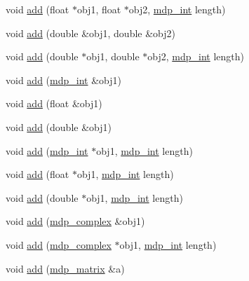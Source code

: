 \begin{DoxyCompactItemize}
\item 
void \hyperlink{classmdp__communicator_aba7a8da3cb9ef8f8fe782864fdfb4e48}{add} (float $\ast$obj1, float $\ast$obj2, \hyperlink{mdp__global__vars_8h_aaa1ad9d0dcd2124aa5af0120d9954174}{mdp\+\_\+int} length)
\item 
void \hyperlink{classmdp__communicator_a6386050a1fa9b536ab8eae4bc922fbad}{add} (double \&obj1, double \&obj2)
\item 
void \hyperlink{classmdp__communicator_a03f093e5354811e65cd862b6400b51de}{add} (double $\ast$obj1, double $\ast$obj2, \hyperlink{mdp__global__vars_8h_aaa1ad9d0dcd2124aa5af0120d9954174}{mdp\+\_\+int} length)
\item 
void \hyperlink{classmdp__communicator_a3d61eabaa51bd8492555478025fda1c6}{add} (\hyperlink{mdp__global__vars_8h_aaa1ad9d0dcd2124aa5af0120d9954174}{mdp\+\_\+int} \&obj1)
\item 
void \hyperlink{classmdp__communicator_a0cc36aa2f7f3cdcdfbf179af0a8e355d}{add} (float \&obj1)
\item 
void \hyperlink{classmdp__communicator_a9eb1537c0b4252cd9e553bd888630faf}{add} (double \&obj1)
\item 
void \hyperlink{classmdp__communicator_aedb0bdc142ac49ff99bfa185d8f8da09}{add} (\hyperlink{mdp__global__vars_8h_aaa1ad9d0dcd2124aa5af0120d9954174}{mdp\+\_\+int} $\ast$obj1, \hyperlink{mdp__global__vars_8h_aaa1ad9d0dcd2124aa5af0120d9954174}{mdp\+\_\+int} length)
\item 
void \hyperlink{classmdp__communicator_a931be4e0b188065e33a16877a63bfe01}{add} (float $\ast$obj1, \hyperlink{mdp__global__vars_8h_aaa1ad9d0dcd2124aa5af0120d9954174}{mdp\+\_\+int} length)
\item 
void \hyperlink{classmdp__communicator_ac78cceeab56a8e83a1921e1e930ce7d1}{add} (double $\ast$obj1, \hyperlink{mdp__global__vars_8h_aaa1ad9d0dcd2124aa5af0120d9954174}{mdp\+\_\+int} length)
\item 
void \hyperlink{classmdp__communicator_a94f4656c5dd9befe04abe0cf5bf83de0}{add} (\hyperlink{classmdp__complex}{mdp\+\_\+complex} \&obj1)
\item 
void \hyperlink{classmdp__communicator_aa5349744a5384adbbdd3cf7dc2a5b95a}{add} (\hyperlink{classmdp__complex}{mdp\+\_\+complex} $\ast$obj1, \hyperlink{mdp__global__vars_8h_aaa1ad9d0dcd2124aa5af0120d9954174}{mdp\+\_\+int} length)
\item 
void \hyperlink{classmdp__communicator_a5e533ae9ef363e9e39dfc9f788aeab19}{add} (\hyperlink{classmdp__matrix}{mdp\+\_\+matrix} \&a)
\item 

\end{DoxyCompactItemize}
